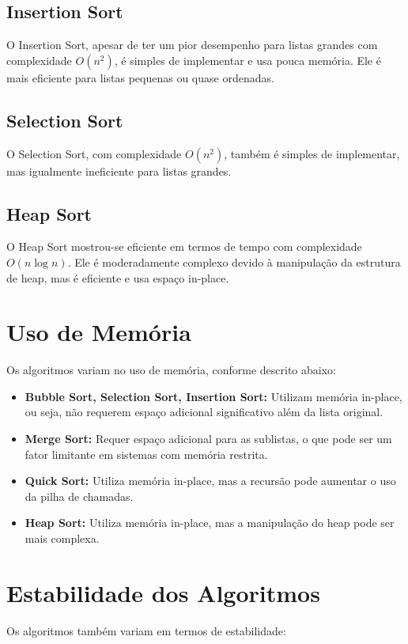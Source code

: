 \documentclass[tcc2]{uftex}
\begin{document}
\subsection{Insertion Sort}
O Insertion Sort, apesar de ter um pior desempenho para listas grandes com complexidade $O(n^2)$, é simples de implementar e usa pouca memória. Ele é mais eficiente para listas pequenas ou quase ordenadas.

\subsection{Selection Sort}
O Selection Sort, com complexidade $O(n^2)$, também é simples de implementar, mas igualmente ineficiente para listas grandes.

\subsection{Heap Sort}
O Heap Sort mostrou-se eficiente em termos de tempo com complexidade $O(n \log n)$. Ele é moderadamente complexo devido à manipulação da estrutura de heap, mas é eficiente e usa espaço in-place.

\section{Uso de Memória}
Os algoritmos variam no uso de memória, conforme descrito abaixo:

\begin{itemize}
  \item \textbf{Bubble Sort, Selection Sort, Insertion Sort:} Utilizam memória in-place, ou seja, não requerem espaço adicional significativo além da lista original.
  \item \textbf{Merge Sort:} Requer espaço adicional para as sublistas, o que pode ser um fator limitante em sistemas com memória restrita.
  \item \textbf{Quick Sort:} Utiliza memória in-place, mas a recursão pode aumentar o uso da pilha de chamadas.
  \item \textbf{Heap Sort:} Utiliza memória in-place, mas a manipulação do heap pode ser mais complexa.
\end{itemize}

\section{Estabilidade dos Algoritmos}
Os algoritmos também variam em termos de estabilidade:
\end{document}
